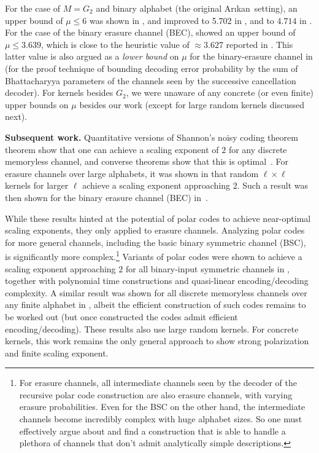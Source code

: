 \documentclass[11pt]{article}
\newcommand{\Arikan}{Ar\i kan}
\begin{document}
For the case of
$M=G_2$ and binary alphabet (the original \Arikan\ setting), an upper bound
of $\mu \le 6$ was shown in \cite{HAU14}, and improved to 5.702
in \cite{GoldinB14}, and to $4.714$ in \cite{MHU16}. For the case of the binary erasure channel (BEC), \cite{MHU16} showed an upper bound of $\mu \le 3.639$, which is close to the heuristic value of $\approx 3.627$ reported in \cite{KMTU}. This latter value is also argued as a \emph{lower bound} on $\mu$ for the binary-erasure channel in \cite{HAU14} (for the proof technique of bounding decoding error probability by the sum of Bhattacharyya parameters of the channels seen by the successive cancellation decoder). For kernels besides $G_2$, we were unaware of any concrete (or even finite) upper bounds on $\mu$ besides our work (except for large random kernels discussed next).

\medskip\noindent\textbf{Subsequent work.}
Quantitative versions of Shannon's noisy coding theorem theorem show that one can achieve a scaling exponent of $2$ for any discrete memoryless channel, and converse theorems show that this is optimal~\cite{wolfowitz,strassen}.
For erasure channels over large alphabets, it was shown in \cite{PfisterU19} that random $\ell \times \ell$ kernels for larger $\ell$ achieve a scaling exponent approaching $2$. Such a result was then shown for the binary erasure channel (BEC) in~\cite{FHMV21}.

While these results hinted at the potential of polar codes to achieve near-optimal scaling exponents, they only applied to erasure channels. Analyzing polar codes for more general channels, including the basic binary symmetric channel (BSC), is significantly more complex.\footnote{For erasure channels, all intermediate channels seen by the decoder of the recursive polar code construction are also erasure channels, with varying erasure probabilities. Even for the BSC on the other hand, the intermediate channels become incredibly complex with huge alphabet sizes. So one must effectively argue about and find a construction that is able to handle a plethora of channels that don't admit analytically simple descriptions.}
Variants of polar codes were shown to achieve a scaling exponent approaching $2$ for all binary-input symmetric channels in \cite{GRY20}, together with polynomial time constructions and quasi-linear encoding/decoding complexity. A similar result was shown for all discrete memoryless channels over any finite alphabet in \cite{WD21}, albeit the efficient construction of such codes remains to be worked out (but once constructed the codes admit efficient encoding/decoding). These results also use large random kernels. For concrete kernels, this work remains the only general approach to show strong polarization and finite scaling exponent.
\end{document}
